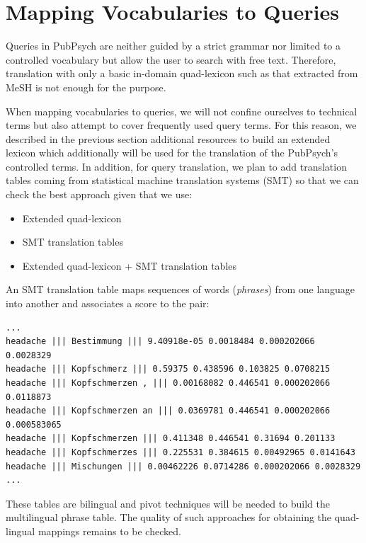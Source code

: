 \documentclass[a4paper,11pt]{article}
\begin{document}
\section{Mapping Vocabularies to Queries}
\label{s:smt}

Queries in PubPsych are neither guided by a strict grammar nor limited to a controlled vocabulary but allow the user to search with free text. Therefore, translation with only a basic in-domain quad-lexicon such as that extracted from MeSH is not enough for the purpose.

When mapping vocabularies to queries, we will not confine ourselves to technical terms but also attempt to cover frequently used query terms. For this reason, we described in the previous section additional resources to build an extended lexicon which additionally will be used for the translation of the PubPsych's controlled terms. In addition, for query translation, we plan to add translation tables coming from statistical machine translation systems (SMT) so that we can check the best approach given that we use:

\begin{itemize}
 \item Extended quad-lexicon
 \item SMT translation tables
 \item Extended quad-lexicon + SMT translation tables 
\end{itemize}

An SMT translation table maps sequences of words (\emph{phrases}) from one language into another and associates a score to the pair:

{\small
\begin{verbatim}
...
headache ||| Bestimmung ||| 9.40918e-05 0.0018484 0.000202066 0.0028329
headache ||| Kopfschmerz ||| 0.59375 0.438596 0.103825 0.0708215 
headache ||| Kopfschmerzen , ||| 0.00168082 0.446541 0.000202066 0.0118873 
headache ||| Kopfschmerzen an ||| 0.0369781 0.446541 0.000202066 0.000583065 
headache ||| Kopfschmerzen ||| 0.411348 0.446541 0.31694 0.201133 
headache ||| Kopfschmerzes ||| 0.225531 0.384615 0.00492965 0.0141643 
headache ||| Mischungen ||| 0.00462226 0.0714286 0.000202066 0.0028329 
...
\end{verbatim}
}

These tables are bilingual and pivot techniques will be needed to build the multilingual phrase table. The quality of such approaches for obtaining the quad-lingual mappings remains to be checked.
\end{document}
